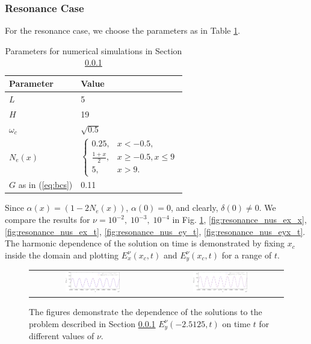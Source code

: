 \subsubsection{Resonance Case}
\label{sec:resn}
For the resonance case, we choose the parameters as in Table \ref{tab:parameters_resonance}.
\begin{table}[htb!]
\begin{tabular}{l|l}
Parameter & Value \\
\hline
$L$ & 5\\
$H$ & 19\\
$\omega_c$ &  $\sqrt{0.5}$\\
$N_e(x)$ &  $\left\{
 \begin{array}{lr}
  0.25, & x<-0.5,\\
  \frac{1+x}{2}, & x\geq -0.5, x\leq 9\\
  5, & x>9.
 \end{array}\right.$\\
 $G$ as in (\ref{eq:bcs}) & 0.11 \\
\end{tabular}
\caption{Parameters for numerical simulations in Section \ref{sec:resn}}
\label{tab:parameters_resonance}
\end{table}
Since $\alpha(x)=(1-2N_e(x))$, $\alpha(0)=0$, and clearly, $\delta(0)\neq 0$. We compare the results for $\nu=10^{-2},\; 10^{-3},\; 10^{-4}$ in Fig. \ref{fig:resonance_nus_ey_x}, 
\ref{fig:resonance_nus_ex_x}, \ref{fig:resonance_nus_ex_t}, \ref{fig:resonance_nus_ey_t}, \ref{fig:resonance_nus_eyx_t}. 
The harmonic dependence of the solution on time is demonstrated by fixing $x_c$ inside the domain and plotting 
$E_x^{\nu}(x_c,t)$ and $E_y^{\nu}(x_c, t)$ for a range of $t$. 
\begin{figure}
\begin{tabular}{cc}
\includegraphics[width=0.45\textwidth]{pics_time_domain/res/ey_fixed_x-crop.pdf}&
\includegraphics[width=0.45\textwidth]{pics_time_domain/res/ey_fixed_x_1e3-crop.pdf}
 \end{tabular}
\caption{The figures demonstrate the dependence of the solutions to the problem described in Section \ref{sec:resn} 
$E_y^{\nu}(-2.5125,t)$ on time $t$ for different values of $\nu$. }
\label{fig:resonance_nus_ey_x}
\end{figure}
